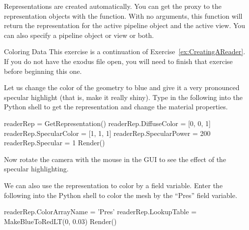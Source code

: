 Representations are created automatically.  You can get the proxy to the
representation objects with the  function.  With
no arguments, this function will return the representation for the active
pipeline object and the active view.  You can also specify a pipeline
object or view or both.

\begin{exercise}{Coloring Data}
  \label{ex:ColoringData}%
  This exercise is a continuation of Exercise~\ref{ex:CreatingAReader}.  If
  you do not have the exodus file open, you will need to finish that
  exercise before beginning this one.

  Let us change the color of the geometry to blue and give it a very
  pronounced specular highlight (that is, make it really shiny).  Type in
  the following into the Python shell to get the representation and change
  the material properties.

  \begin{python}
readerRep = GetRepresentation()
readerRep.DiffuseColor = [0, 0, 1]
readerRep.SpecularColor = [1, 1, 1]
readerRep.SpecularPower = 200
readerRep.Specular = 1
Render()
  \end{python}

  Now rotate the camera with the mouse in the GUI to see the effect of the
  specular highlighting.

  We can also use the representation to color by a field variable.  Enter
  the following into the Python shell to color the mesh by the ``Pres''
  field variable.

  \begin{python}
readerRep.ColorArrayName = 'Pres'
readerRep.LookupTable = MakeBlueToRedLT(0, 0.03)
Render()
  \end{python}
\end{exercise}


